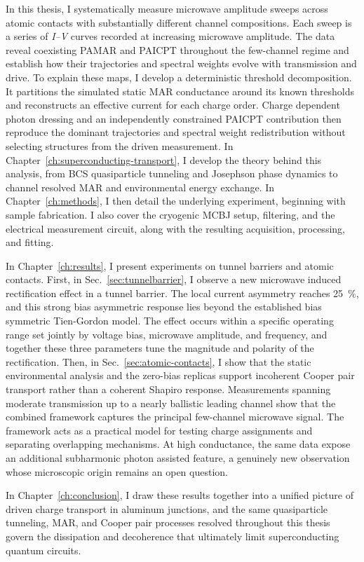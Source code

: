    In this thesis, I systematically measure microwave amplitude sweeps across atomic contacts with substantially different channel compositions. Each sweep is a series of \textit{I--V} curves recorded at increasing microwave amplitude. The data reveal coexisting PAMAR and PAICPT throughout the few-channel regime and establish how their trajectories and spectral weights evolve with transmission and drive. To explain these maps, I develop a deterministic threshold decomposition. It partitions the simulated static MAR conductance around its known thresholds and reconstructs an effective current for each charge order. Charge dependent photon dressing and an independently constrained PAICPT contribution then reproduce the dominant trajectories and spectral weight redistribution without selecting structures from the driven measurement. In Chapter~\ref{ch:superconducting-transport}, I develop the theory behind this analysis, from BCS quasiparticle tunneling and Josephson phase dynamics to channel resolved MAR and environmental energy exchange. In Chapter~\ref{ch:methods}, I then detail the underlying experiment, beginning with sample fabrication. I also cover the cryogenic MCBJ setup, filtering, and the electrical measurement circuit, along with the resulting acquisition, processing, and fitting.

    In Chapter~\ref{ch:results}, I present experiments on tunnel barriers and atomic contacts. First, in Sec.~\ref{sec:tunnelbarrier}, I observe a new microwave induced rectification effect in a tunnel barrier. The local current asymmetry reaches \qty{25}{\percent}, and this strong bias asymmetric response lies beyond the established bias symmetric Tien-Gordon model. The effect occurs within a specific operating range set jointly by voltage bias, microwave amplitude, and frequency, and together these three parameters tune the magnitude and polarity of the rectification. Then, in Sec.~\ref{sec:atomic-contacts}, I show that the static environmental analysis and the zero-bias replicas support incoherent Cooper pair transport rather than a coherent Shapiro response. Measurements spanning moderate transmission up to a nearly ballistic leading channel show that the combined framework captures the principal few-channel microwave signal. The framework acts as a practical model for testing charge assignments and separating overlapping mechanisms. At high conductance, the same data expose an additional subharmonic photon assisted feature, a genuinely new observation whose microscopic origin remains an open question.
    
    In Chapter~\ref{ch:conclusion}, I draw these results together into a unified picture of driven charge transport in aluminum junctions, and the same quasiparticle tunneling, MAR, and Cooper pair processes resolved throughout this thesis govern the dissipation and decoherence that ultimately limit superconducting quantum circuits.
